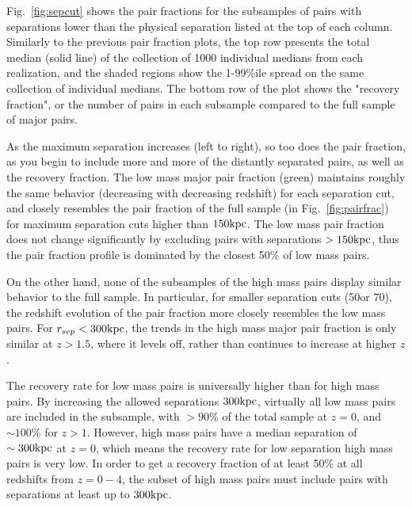\documentclass[twocolumn]{aastex631}
\begin{document}
    Fig.~\ref{fig:sepcut} shows the pair fractions for the subsamples of pairs with separations lower than the physical separation listed at the top of each column. 
    Similarly to the previous pair fraction plots, the top row presents the total median (solid line) of the collection of 1000 individual medians from each realization, and the shaded regions show the 1-99\%ile spread on the same collection of individual medians. 
    The bottom row of the plot shows the "recovery fraction", or the number of pairs in each subsample compared to the full sample of major pairs.
    
    As the maximum separation increases (left to right), so too does the pair fraction, as you begin to include more and more of the distantly separated pairs, as well as the recovery fraction. 
    The low mass major pair fraction (green) maintains roughly the same behavior (decreasing with decreasing redshift) for each separation cut, and closely resembles the pair fraction of the full sample (in Fig.~\ref{fig:pairfrac}) for maximum separation cuts higher than $150\mathrm{kpc}$. 
    The low mass pair fraction does not change significantly by excluding pairs with separations $>150\mathrm{kpc}$, thus the pair fraction profile is dominated by the closest 50\% of low mass pairs. 

    On the other hand, none of the subsamples of the high mass pairs display similar behavior to the full sample. 
    In particular, for smaller separation cuts (50\kpc or 70\kpc), the redshift evolution of the pair fraction more closely resembles the low mass pairs.
    For $r_{sep}<300\mathrm{kpc}$, the trends in the high mass major pair fraction is only similar at $z>1.5$, where it levels off, rather than continues to increase at higher $z$. 

    The recovery rate for low mass pairs is universally higher than for high mass pairs.
    By increasing the allowed separations $300\mathrm{kpc}$, virtually all low mass pairs are included in the subsample, with $>90\%$ of the total sample at $z=0$, and $\sim100\%$ for $z>1$.
    However, high mass pairs have a median separation of $\sim300\mathrm{kpc}$ at $z=0$, which means the recovery rate for low separation high mass pairs is very low. 
    In order to get a recovery fraction of at least 50\% at all redshifts from $z=0-4$, the subset of high mass pairs must include pairs with separations at least up to $300\mathrm{kpc}$.
    
\end{document}
